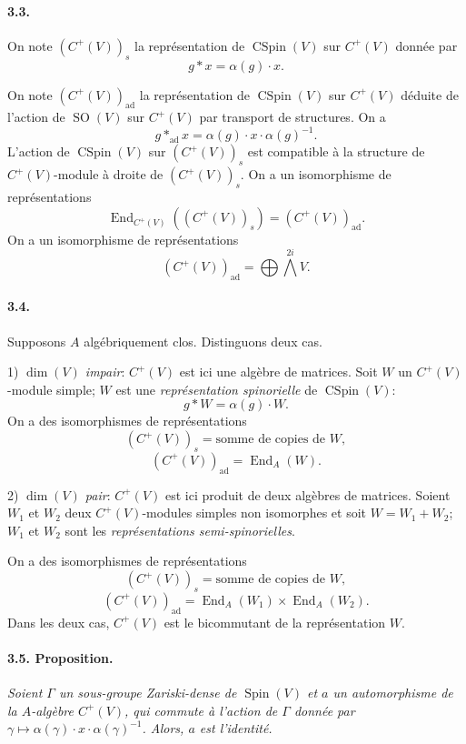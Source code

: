 \documentclass[10pt,leqno]{article}
\newcommand{\End}{\operatorname{End}}
\newcommand{\SO}{\operatorname{SO}}
\newcommand{\Spin}{\operatorname{Spin}}
\newcommand{\CSpin}{\operatorname{CSpin}}
\newcommand{\ad}{\operatorname{ad}}
\begin{document}
\paragraph{3.3.} On note $(C^+(V))_s$ la représentation de $\CSpin(V)$ sur $C^+(V)$ donnée par
\[
\tag{3.3.1}
g*x=\alpha(g)\cdot x.
\]

\clearpage

On note $(C^+(V))_{\ad}$ la représentation de $\CSpin(V)$ sur $C^+(V)$ déduite de l'action de $\SO(V)$ sur $C^+(V)$ par transport de structures. On a
\[
\tag{3.3.2}
g*_{\ad}x=\alpha(g)\cdot x\cdot\alpha(g)^{-1}.
\]
L'action de $\CSpin(V)$ sur $(C^+(V))_s$ est compatible à la structure de $C^+(V)$-module à droite de $(C^+(V))_s$. On a un isomorphisme de représentations
\[
\tag{3.3.3}
\End_{C^+(V)}((C^+(V))_s)=(C^+(V))_{\ad}.
\]
On a un isomorphisme de représentations
\[
\tag{3.3.4}
(C^+(V))_{\ad}=\bigoplus \bigwedge^{2i} V.
\]

\paragraph{3.4.} Supposons $A$ algébriquement clos. Distinguons deux cas.

1) \emph{$\dim(V)$ impair}: $C^+(V)$ est ici une algèbre de matrices. Soit $W$ un $C^+(V)$-module simple; $W$ est une \emph{représentation spinorielle} de $\CSpin(V)$:
\[
g*W=\alpha(g)\cdot W.
\]
On a des isomorphismes de représentations
\[
\tag{3.4.1}
(C^+(V))_s=\text{somme de copies de }W,
\]
\[
\tag{3.4.2}
(C^+(V))_{\ad}=\End_A(W).
\]

2) \emph{$\dim(V)$ pair}: $C^+(V)$ est ici produit de deux algèbres de matrices. Soient $W_1$ et $W_2$ deux $C^+(V)$-modules simples non isomorphes et soit $W=W_1+W_2$; $W_1$ et $W_2$ sont les \emph{représentations semi-spinorielles}.

On a des isomorphismes de représentations
\[
\tag{3.4.3}
(C^+(V))_s=\text{somme de copies de }W,
\]
\[
\tag{3.4.4}
(C^+(V))_{\ad}=\End_A(W_1)\times\End_A(W_2).
\]
Dans les deux cas, $C^+(V)$ est le bicommutant de la représentation $W$.

\paragraph{3.5. Proposition.} \emph{Soient $\Gamma$ un sous-groupe Zariski-dense de $\Spin(V)$ et $a$ un automorphisme de la $A$-algèbre $C^+(V)$, qui commute à l'action de $\Gamma$ donnée par $\gamma\mapsto\alpha(\gamma)\cdot x\cdot\alpha(\gamma)^{-1}$. Alors, $a$ est l'identité.}
\end{document}
